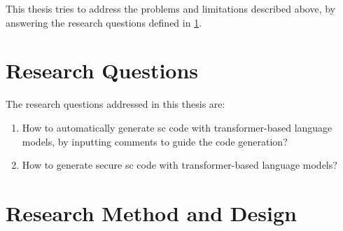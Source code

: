 This thesis tries to address the problems and limitations described above, by answering the research questions defined in \cref{sec:research-questions}.

\section{Research Questions}
\label{sec:research-questions}
The research questions addressed in this thesis are:

\begin{enumerate}[label=\textbf{RQ\arabic*.}, leftmargin=1.5cm]
    \item How to automatically generate \acrlong{sc} code with transformer-based language models, by inputting comments to guide the code generation?
    \item How to generate secure \acrlong{sc} code with transformer-based language models?
\end{enumerate}

\section{Research Method and Design}
\label{sec:research-method-and-design}


